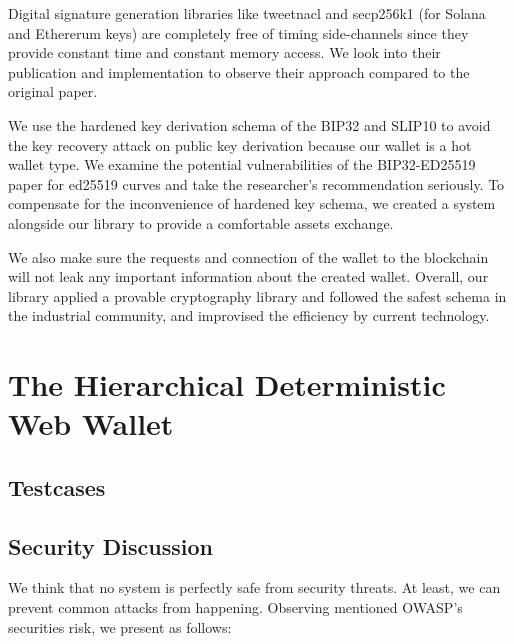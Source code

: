 Digital signature generation libraries like tweetnacl and secp256k1 (for Solana and Ethererum keys) are completely free of timing side-channels since they provide constant time and constant memory access. We look into their publication and implementation to observe their approach compared to the original paper.
\bigskip

We use the hardened key derivation schema of the BIP32 and SLIP10 to avoid the key recovery attack on public key derivation because our wallet is a hot wallet type. We examine the potential vulnerabilities of the BIP32-ED25519 paper for ed25519 curves and take the researcher's recommendation seriously. To compensate for the inconvenience of hardened key schema, we created a system alongside our library to provide a comfortable assets exchange.
\bigskip

We also make sure the requests and connection of the wallet to the blockchain will not leak any important information about the created wallet. Overall, our library applied a provable cryptography library and followed the safest schema in the industrial community, and improvised the efficiency by current technology.

\section{The Hierarchical Deterministic Web Wallet}
\label{testhd}
\subsection{Testcases}
\subsection{Security Discussion}

We think that no system is perfectly safe from security threats. At least, we can prevent common attacks from happening. Observing mentioned OWASP’s securities risk, we present as follows:

